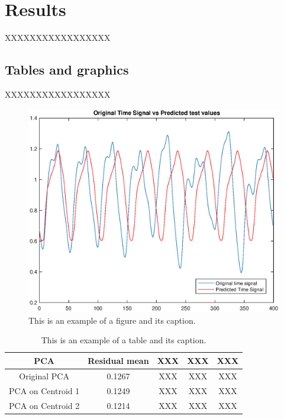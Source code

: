\chapter{Results}

XXXXXXXXXXXXXXXXX



\section{Tables and graphics}

XXXXXXXXXXXXXXXXX

\begin{figure}[!ht]
\includegraphics[clip,width=\columnwidth]{figures/PlotTimeSeriesResult}%
\caption[Graph.]{This is an example of a figure and its caption.}
\label{fig:timeseries}
\end{figure}

\begin{table}[!ht]
\renewcommand{\arraystretch}{1.50}
\caption[Table]{This is an example of a table and its caption.}
\label{tablePCA}
\centering
\begin{tabular}{| c | c | c | c | c |}
\hline
\bfseries PCA & \bfseries Residual mean & \bfseries XXX & \bfseries XXX & \bfseries XXX \\
\hline\hline
Original PCA & 0.1267 & XXX & XXX & XXX  \\
\hline
PCA on Centroid 1 & 0.1249 & XXX & XXX  & XXX\\
\hline
PCA on Centroid 2 & 0.1214  & XXX & XXX  & XXX\\
\hline
\end{tabular}
\end{table}

\newpage


